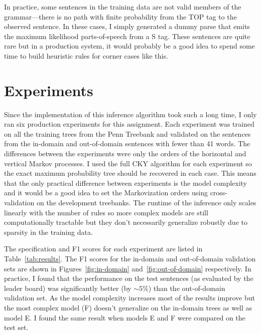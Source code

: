 \documentclass[11pt]{article}
\newcommand{\code}[1]{{\sffamily #1}}
\begin{document}
In practice, some sentences in the training data are not valid members of the
grammar---there is no path with finite probability from the \code{TOP} tag to
the observed sentence.
In these cases, I simply generated a dummy parse that emits the maximum
likelihood parts-of-speech from a \code{S} tag.
These sentences are quite rare but in a production system, it would probably
be a good idea to spend some time to build heuristic rules for corner cases
like this.

\section{Experiments}

Since the implementation of this inference algorithm took such a long time, I
only ran six production experiments for this assignment.
Each experiment was trained on all the training trees from the Penn Treebank
and validated on the sentences from the in-domain and out-of-domain
sentences with fewer than 41 words.
The differences between the experiments were only the orders of the
horizontal and vertical Markov processes.
I used the full CKY algorithm for each experiment so the exact maximum
probability tree should be recovered in each case.
This means that the only practical difference between experiments is the model
complexity and it would be a good idea to set the Markovization orders using
cross-validation on the development treebanks.
The runtime of the inference only scales linearly with the number of rules so
more complex models are still computationally tractable but they don't
necessarily generalize robustly due to sparsity in the training data.

The specification and F1 scores for each experiment are listed in
Table~\ref{tab:results}.
The F1 scores for the in-domain and out-of-domain validation sets are shown in
Figures~\ref{fig:in-domain} and~\ref{fig:out-of-domain} respectively.
In practice, I found that the performance on the test sentences (as evaluated
by the leader board) was significantly better (by $\sim 5\%$) than the
out-of-domain validation set.
As the model complexity increases most of the results improve but the most
complex model (F) doesn't generalize on the in-domain trees as well as model
E.
I found the same result when models E and F were compared on the test set.
\end{document}
